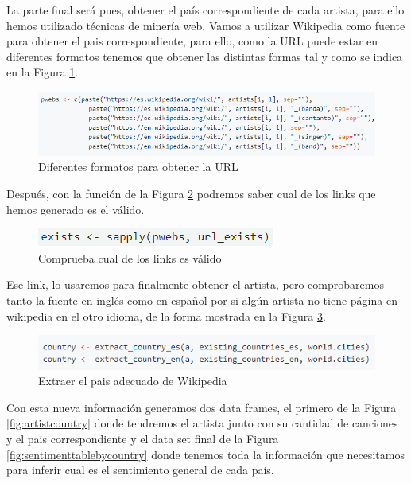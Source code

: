 La parte final será pues, obtener el país correspondiente de cada artista, para ello hemos utilizado técnicas de minería web. Vamos a utilizar Wikipedia como fuente para obtener el pais correspondiente, para ello, como la URL puede estar en diferentes formatos tenemos que obtener las distintas formas tal y como se indica en la Figura \ref{fig:artists-wikipedia}. 

\begin{figure}[h]
	\centering
	\includegraphics[width=0.7\linewidth]{Imagenes/artists-wikipedia}
	\caption{Diferentes formatos para obtener la URL}
	\label{fig:artists-wikipedia}
\end{figure}

Después, con la función de la Figura \ref{fig:link-exists} podremos saber cual de los links que hemos generado es el válido. 

\begin{figure}[h]
	\centering
	\includegraphics[width=0.7\linewidth]{Imagenes/link-exists}
	\caption{Comprueba cual de los links es válido}
	\label{fig:link-exists}
\end{figure}

Ese link, lo usaremos para finalmente obtener el artista, pero comprobaremos tanto la fuente en inglés como en español por si algún artista no tiene página en wikipedia en el otro idioma, de la forma mostrada en la Figura \ref{fig:asignar-oais}.

\begin{figure}[h]
	\centering
	\includegraphics[width=0.7\linewidth]{Imagenes/asignar-oais}
	\caption{Extraer el pais adecuado de Wikipedia}
	\label{fig:asignar-oais}
\end{figure}

Con esta nueva información generamos dos data frames, el primero de la Figura \ref{fig:artistcountry} donde tendremos el artista junto con su cantidad de canciones y el pais correspondiente y el data set final de la Figura \ref{fig:sentimenttablebycountry} donde tenemos toda la información que necesitamos para inferir cual es el sentimiento general de cada país.

